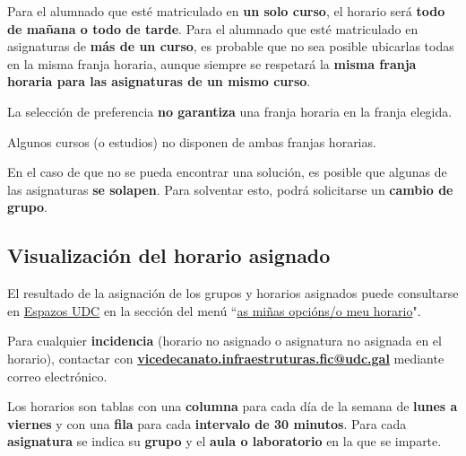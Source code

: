 Para el alumnado que esté matriculado en \textbf{un solo curso}, el horario será \textbf{todo de mañana o todo de tarde}. Para el alumnado que esté matriculado en asignaturas de \textbf{más de un curso}, es probable que no sea posible ubicarlas todas en la misma franja horaria, aunque siempre se respetará la \textbf{misma franja horaria para las asignaturas de un mismo curso}.

\begin{warningBox}
    La selección de preferencia \textbf{no garantiza} una franja horaria en la franja elegida.
\end{warningBox}

\begin{warningBox}
    Algunos cursos (o estudios) no disponen de ambas franjas horarias.
\end{warningBox}

\begin{importantBox}
    En el caso de que no se pueda encontrar una solución, es posible que algunas de las asignaturas \textbf{se solapen}. Para solventar esto, podrá solicitarse un \textbf{cambio de grupo}.
\end{importantBox}

\subsection{Visualización del horario asignado}

El resultado de la asignación de los grupos y horarios asignados puede consultarse en \href{\linkEspazosUDC}{Espazos UDC} en la sección del menú  ``\href{https://espazos.udc.es/centers/614/timetable/preference}{as miñas opcións/o meu horario}".

\begin{importantBox}
    Para cualquier \textbf{incidencia} (horario no asignado o asignatura no asignada en el horario), contactar con \href{mailto:vicedecanato.infraestruturas.fic@udc.gal}{\textbf{vicedecanato.infraestruturas.fic@udc.gal}} mediante correo electrónico.
\end{importantBox}

Los horarios son tablas con una \textbf{columna} para cada día de la semana de \textbf{lunes a viernes} y con una \textbf{fila} para cada \textbf{intervalo de 30 minutos}. Para cada \textbf{asignatura} se indica su \textbf{grupo} y el \textbf{aula o laboratorio} en la que se imparte.

\FloatBarrier
\begin{figure}[htp]
    \centering
\end{figure}
\FloatBarrier

